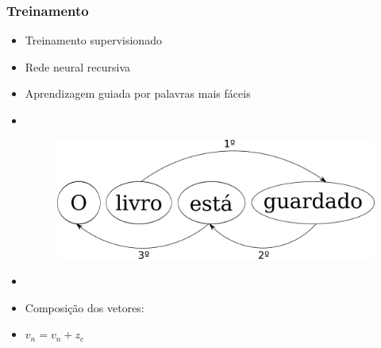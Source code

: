 \documentclass[10pt]{beamer}
\begin{document}
\begin{frame}[fragile]
\frametitle{Treinamento}
  
  \begin{itemize}

    \item[-] Treinamento supervisionado

    \item[-] Rede neural recursiva

    \item[-] Aprendizagem guiada por palavras mais fáceis \cite{shen2007guided}

    \item[\ ] \

    \begin{figure}[htb]
        \begin{center}
            \includegraphics[scale=0.35]{img/guidedlearning.pdf}
        \end{center}
    \end{figure}


    \item[\ ] \

    \item[-] Composição dos vetores:

    \item[\ ] $v_n = v_n + z_c$ 

  \end{itemize}


\end{frame}
\end{document}
